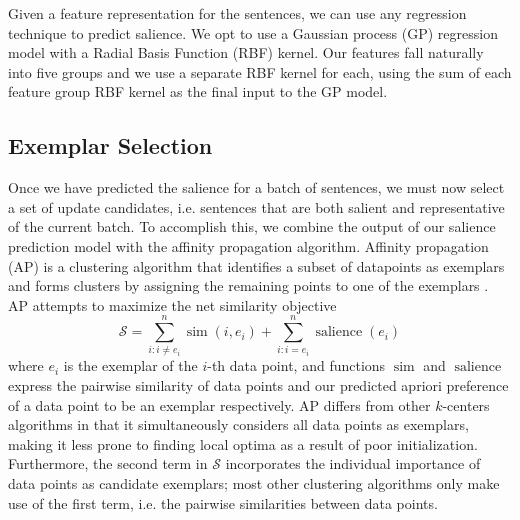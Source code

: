 Given a feature representation for the sentences, we can use
any regression technique to predict salience.
We opt to use a Gaussian process (GP) regression model
\cite{rasmussen:gaussian-process-book} with a Radial Basis Function (RBF) 
kernel.  
Our features fall naturally into five groups and we use a separate RBF kernel
for each, using the sum of each feature group RBF kernel as the final input
to the GP model.




\subsection{Exemplar Selection}
\label{sec:exsel}

Once we have predicted the salience for a batch of sentences, we must
now select a set of update candidates, i.e. sentences that are both salient
and representative of the current batch.
To accomplish this, we combine the output of our 
salience prediction model with the affinity
propagation algorithm.
Affinity propagation (AP) is a clustering algorithm
that identifies a subset of datapoints as exemplars and forms clusters
by assigning the remaining points to one of the exemplars 
\cite{frey2007clustering}. AP attempts to 
maximize the net similarity objective 
\[ \mathcal{S} = \sum_{i : i \neq e_i}^n \operatorname{sim}(i,e_i) 
+ \sum_{i : i = e_i}^n \operatorname{salience}(e_i)  \]
where $e_i$ is the exemplar of the $i$-th data point, and functions
$\operatorname{sim}$ and $\operatorname{salience}$ express the pairwise 
similarity
of data points and our predicted apriori preference of a data point to be an exemplar
respectively. 
AP differs from other $k$-centers algorithms in that it simultaneously 
considers all data points as exemplars, making it less prone to finding
local optima as a result of poor initialization. Furthermore, the 
second term in $\mathcal{S}$ incorporates the individual importance of 
data points as candidate exemplars; most other clustering algorithms only make
use of the first term, i.e. the pairwise similarities between data points.
 
